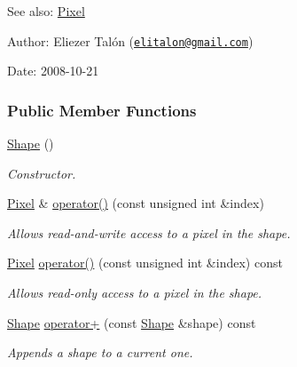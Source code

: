 \begin{Desc}
\item[See also:]\hyperlink{_shape_8hpp_535e59456e3e633842529cfa8ea103c4}{Pixel}\end{Desc}
\begin{Desc}
\item[Author:]Eliezer Talón (\href{mailto:elitalon@gmail.com}{\tt elitalon@gmail.com}) \end{Desc}
\begin{Desc}
\item[Date:]2008-10-21 \end{Desc}
\subsubsection*{Public Member Functions}
\begin{CompactItemize}
\item 
\hyperlink{class_shape_aa8d87171e65e0d8ba3c5459978992a7}{Shape} ()
\begin{CompactList}\small\item\em Constructor. \item\end{CompactList}\item 
\hyperlink{_shape_8hpp_535e59456e3e633842529cfa8ea103c4}{Pixel} \& \hyperlink{class_shape_7d12f3a76e2bfb7963c00237eba41e0a}{operator()} (const unsigned int \&index)
\begin{CompactList}\small\item\em Allows read-and-write access to a pixel in the shape. \item\end{CompactList}\item 
\hyperlink{_shape_8hpp_535e59456e3e633842529cfa8ea103c4}{Pixel} \hyperlink{class_shape_79caae3047826779e0c8094e9882843b}{operator()} (const unsigned int \&index) const 
\begin{CompactList}\small\item\em Allows read-only access to a pixel in the shape. \item\end{CompactList}\item 
\hyperlink{class_shape}{Shape} \hyperlink{class_shape_4e1517d6e14471df4750bc241f517b4e}{operator+} (const \hyperlink{class_shape}{Shape} \&shape) const 
\begin{CompactList}\small\item\em Appends a shape to a current one. \item\end{CompactList}\item 

\end{CompactItemize}
